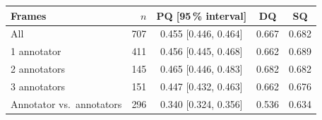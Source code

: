     \begin{tabular}{lrccc}
        \toprule
        Frames & $n$ & PQ [95\,\% interval] & DQ & SQ \\
        \midrule
        All & 707 & 0.455 [0.446, 0.464] & 0.667 & 0.682 \\
        1 annotator & 411 & 0.456 [0.445, 0.468] & 0.662 & 0.689 \\
        2 annotators & 145 & 0.465 [0.446, 0.483] & 0.682 & 0.682 \\
        3 annotators & 151 & 0.447 [0.432, 0.463] & 0.662 & 0.676 \\
        \midrule
        Annotator vs.\ annotators & 296 & 0.340 [0.324, 0.356] & 0.536 & 0.634 \\
        \bottomrule
    \end{tabular}
